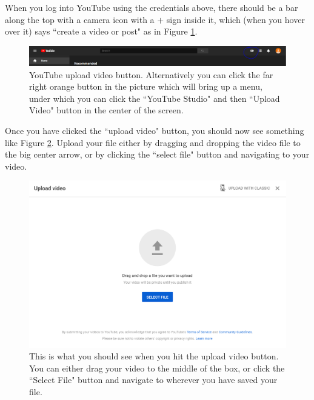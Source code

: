\documentclass{article}
\begin{document}
        When you log into YouTube using the credentials above, there should be a bar along the top with a camera icon with a $+$ sign inside it, which (when you hover over it) says ``create a video or post" as in Figure \ref{uploadButton}.
        
        \begin{figure}[h]
            \includegraphics[width=\textwidth]{youTubeUploadButton.png}
            \caption{YouTube upload video button. Alternatively you can click the far right orange button in the picture which will bring up a menu, under which you can click the ``YouTube Studio" and then ``Upload Video" button in the center of the screen.}
            \label{uploadButton}
        \end{figure}
        
        \newpage
        Once you have clicked the ``upload video" button, you should now see something like Figure \ref{selectFile}. Upload your file either by dragging and dropping the video file to the big center arrow, or by clicking the ``select file" button and navigating to your video. 
        
        \begin{figure}[h]
            \includegraphics[width=\textwidth]{selectFile.png}
            \caption{This is what you should see when you hit the upload video button. You can either drag your video to the middle of the box, or click the ``Select File" button and navigate to wherever you have saved your file.}
            \label{selectFile}
        \end{figure}    
    \newpage
\end{document}
